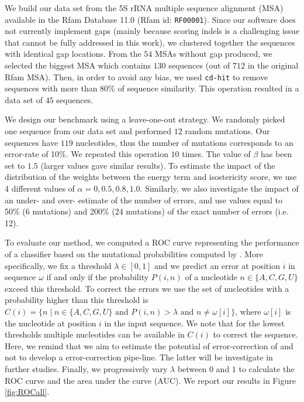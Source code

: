 We build our data set from the 5S rRNA multiple sequence alignment (MSA) available in the Rfam Database 11.0 (Rfam id: \texttt{RF00001}).
Since our software does not currently implement gaps (mainly because scoring indels is a challenging issue that cannot be fully addressed
in this work),  we clustered together the sequences with identical gap locations. From the $54$ MSAs without gap produced, we selected the
biggest MSA  which contains $130$ sequences (out of $712$ in the original Rfam MSA). Then, in order to avoid any bias, we used \texttt{cd-hit}
\cite{Li:2006fk} to remove sequences with more than 80\% of sequence similarity. This operation resulted in a data set of $45$ sequences. 

We design our benchmark using a leave-one-out strategy. We randomly picked one sequence from our data set and performed $12$ random
mutations. Our sequences have $119$ nucleotides, thus the number of mutations corresponds to an error-rate of 10\%. We repeated this operation 
$10$ times. The value of $\beta$ has been set to $1.5$ (larger values gave similar results). To estimate the impact of the distribution of the weights
between the energy term and isostericity  score, we use 4 different values of $\alpha = {0, 0.5, 0.8, 1.0}$. Similarly, we also investigate the impact of 
an under- and over- estimate of the number of errors, and use values equal to 50\% (6 mutations) and 200\% (24 mutations) of the exact number of
errors (i.e. 12).

To evaluate our method, we computed a ROC curve representing the performance of a classifier based on the mutational probabilities computed
by \RNApyro. More specifically, we fix a threshold $\lambda \in [0,1]$ and we predict an error at position $i$ in sequence $\omega$ if and only if the
probability $P(i,n)$ of a nucleotide $n \in \{ A,C,G,U \}$ exceed this threshold. To correct the errors we use the set of nucleotides with a probability
higher than this threshold is  $C(i) = \{ n \; | \;  n \in \{ A,C,G,U \} \mbox{ and } P(i,n) > \lambda \mbox{ and }  n \neq \omega[i] \}$, where $\omega[i]$ is
the nucleotide at position $i$ in the input sequence. We note that for the lowest thresholds multiple nucleotides can be available in $C(i)$ to correct
the sequence. Here, we remind that we aim to estimate the potential of error-correction of \RNApyro and not to develop a error-correction pipe-line. 
The latter will be investigate in further studies. Finally, we progressively vary $\lambda$ between $0$ and $1$ to calculate the ROC curve and the area
under the curve (AUC). We report our results in Figure \ref{fig:ROCall}. 

